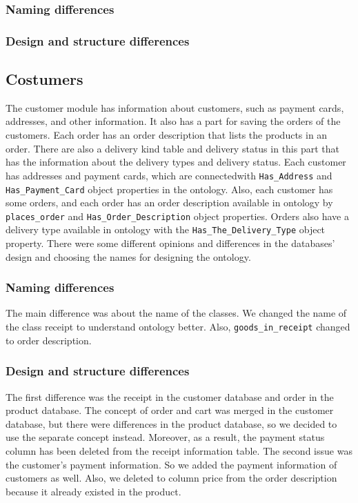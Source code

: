 \documentclass{article}
\begin{document}
\subsubsection{Naming differences}



\subsubsection{Design and structure differences}



\subsection{Costumers}
The customer module has information about customers, such as payment cards, addresses, and other information. It also has a part for saving the orders of the customers. Each order has an order description that lists the products in an order. There are also a delivery kind table and delivery status in this part that has the information about the delivery types and delivery status. Each customer has addresses and payment cards, which are connectedwith \texttt{Has\_Address} and \texttt{Has\_Payment\_Card} object properties in the ontology. Also, each customer has some orders, and each order has an order description available in ontology by \texttt{places\_order} and \texttt{Has\_Order\_Description} object properties. Orders also have a delivery type available in ontology with the \texttt{Has\_The\_Delivery\_Type} object property. There were some different opinions and differences in the databases' design and choosing the names for designing the ontology.

\subsubsection{Naming differences}
The main difference was about the name of the classes. We changed the name of the class receipt to understand ontology better. Also, \texttt{goods\_in\_receipt} changed to order description.

\subsubsection{Design and structure differences}
The first difference was the receipt in the customer database and order in the product database. The concept of order and cart was merged in the customer database, but there were differences in the product database, so we decided to use the separate concept instead. Moreover, as a result, the payment status column has been deleted from the receipt information table. The second issue was the customer's payment information. So we added the payment information of customers as well. Also, we deleted to column price from the order description because it already existed in the product.
\end{document}

